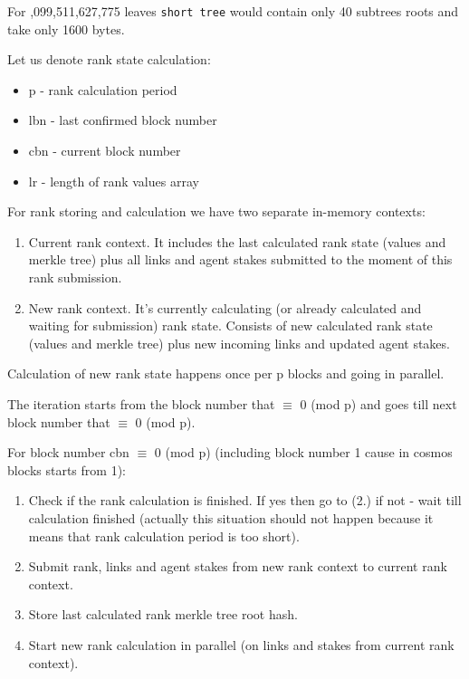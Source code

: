 \documentclass[8pt,oneside]{amsart}
\newcommand{\code}[1]{{\PlayBold #1}}
\begin{document}
For \code{1,099,511,627,775} leaves \verb|short tree| would contain only 40 subtrees roots and take only 1600 bytes.

Let us denote rank state calculation:

\begin{itemize}
    \item[] \code{p} - rank calculation period
    \item[] \code{lbn} - last confirmed block number
    \item[] \code{cbn} - current block number
    \item[] \code{lr} -  length of rank values array
\end{itemize}

For rank storing and calculation we have two separate in-memory contexts:

\begin{enumerate}
\item Current rank context. It includes the last calculated rank state (values and merkle tree) plus
all links and agent stakes submitted to the moment of this rank submission.
\item New rank context. It's currently calculating (or already calculated and waiting for submission) rank state. Consists of new calculated rank state (values and merkle tree) plus new incoming links and updated agent stakes.
\end{enumerate}

Calculation of new rank state happens once per \code{p} blocks and going in parallel.

The iteration starts from the block number that \code{$\equiv$ 0 (mod p)} and goes till next block number that \code{$\equiv$ 0 (mod p)}.

For block number \code{cbn $\equiv$ 0 (mod p)} (including block number 1 cause in cosmos blocks starts from 1):

\begin{enumerate}
  \item Check if the rank calculation is finished. If yes then go to (2.) if not - wait till calculation finished
  (actually this situation should not happen because it means that rank calculation period is too short).
  \item Submit rank, links and agent stakes from new rank context to current rank context.
  \item Store last calculated rank merkle tree root hash.
  \item Start new rank calculation in parallel (on links and stakes from current rank context).
\end{enumerate}
\end{document}
